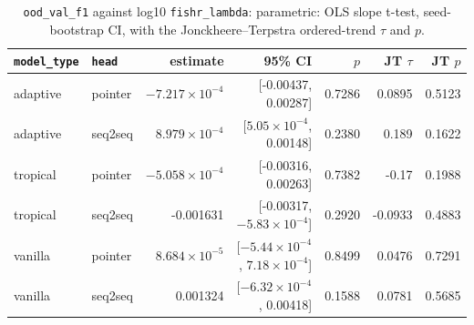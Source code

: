 \documentclass[10pt]{article}
\begin{document}
{\small
\begin{longtable}{llrrrrr}
\caption{\texttt{ood\_val\_f1} against log10 \texttt{fishr\_lambda}: parametric: OLS slope t-test, seed-bootstrap CI, with the Jonckheere--Terpstra ordered-trend $\tau$ and $p$.}\label{tab:trend-ood_val_f1}\\
\toprule
\texttt{model\_type} & \texttt{head} & estimate & 95\% CI & $p$ & JT $\tau$ & JT $p$\\
\midrule
\endhead
adaptive & pointer & $-7.217\times10^{-4}$ & [-0.00437, 0.00287] & 0.7286 & 0.0895 & 0.5123\\
adaptive & seq2seq & $8.979\times10^{-4}$ & [$5.05\times10^{-4}$, 0.00148] & 0.2380 & 0.189 & 0.1622\\
tropical & pointer & $-5.058\times10^{-4}$ & [-0.00316, 0.00263] & 0.7382 & -0.17 & 0.1988\\
tropical & seq2seq & -0.001631 & [-0.00317, $-5.83\times10^{-4}$] & 0.2920 & -0.0933 & 0.4883\\
vanilla & pointer & $8.684\times10^{-5}$ & [$-5.44\times10^{-4}$, $7.18\times10^{-4}$] & 0.8499 & 0.0476 & 0.7291\\
vanilla & seq2seq & 0.001324 & [$-6.32\times10^{-4}$, 0.00418] & 0.1588 & 0.0781 & 0.5685\\
\bottomrule
\end{longtable}
}
\end{document}
